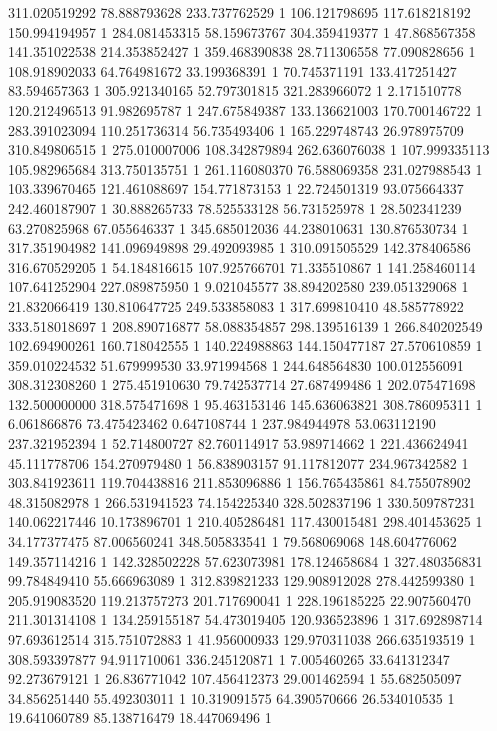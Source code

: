 311.020519292	78.888793628	233.737762529	1
106.121798695	117.618218192	150.994194957	1
284.081453315	58.159673767	304.359419377	1
47.868567358	141.351022538	214.353852427	1
359.468390838	28.711306558	77.090828656	1
108.918902033	64.764981672	33.199368391	1
70.745371191	133.417251427	83.594657363	1
305.921340165	52.797301815	321.283966072	1
2.171510778	120.212496513	91.982695787	1
247.675849387	133.136621003	170.700146722	1
283.391023094	110.251736314	56.735493406	1
165.229748743	26.978975709	310.849806515	1
275.010007006	108.342879894	262.636076038	1
107.999335113	105.982965684	313.750135751	1
261.116080370	76.588069358	231.027988543	1
103.339670465	121.461088697	154.771873153	1
22.724501319	93.075664337	242.460187907	1
30.888265733	78.525533128	56.731525978	1
28.502341239	63.270825968	67.055646337	1
345.685012036	44.238010631	130.876530734	1
317.351904982	141.096949898	29.492093985	1
310.091505529	142.378406586	316.670529205	1
54.184816615	107.925766701	71.335510867	1
141.258460114	107.641252904	227.089875950	1
9.021045577	38.894202580	239.051329068	1
21.832066419	130.810647725	249.533858083	1
317.699810410	48.585778922	333.518018697	1
208.890716877	58.088354857	298.139516139	1
266.840202549	102.694900261	160.718042555	1
140.224988863	144.150477187	27.570610859	1
359.010224532	51.679999530	33.971994568	1
244.648564830	100.012556091	308.312308260	1
275.451910630	79.742537714	27.687499486	1
202.075471698	132.500000000	318.575471698	1
95.463153146	145.636063821	308.786095311	1
6.061866876	73.475423462	0.647108744	1
237.984944978	53.063112190	237.321952394	1
52.714800727	82.760114917	53.989714662	1
221.436624941	45.111778706	154.270979480	1
56.838903157	91.117812077	234.967342582	1
303.841923611	119.704438816	211.853096886	1
156.765435861	84.755078902	48.315082978	1
266.531941523	74.154225340	328.502837196	1
330.509787231	140.062217446	10.173896701	1
210.405286481	117.430015481	298.401453625	1
34.177377475	87.006560241	348.505833541	1
79.568069068	148.604776062	149.357114216	1
142.328502228	57.623073981	178.124658684	1
327.480356831	99.784849410	55.666963089	1
312.839821233	129.908912028	278.442599380	1
205.919083520	119.213757273	201.717690041	1
228.196185225	22.907560470	211.301314108	1
134.259155187	54.473019405	120.936523896	1
317.692898714	97.693612514	315.751072883	1
41.956000933	129.970311038	266.635193519	1
308.593397877	94.911710061	336.245120871	1
7.005460265	33.641312347	92.273679121	1
26.836771042	107.456412373	29.001462594	1
55.682505097	34.856251440	55.492303011	1
10.319091575	64.390570666	26.534010535	1
19.641060789	85.138716479	18.447069496	1
